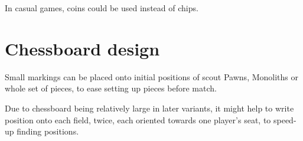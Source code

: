 In casual games, coins could be used instead of chips.

\section*{Chessboard design}
\label{sec:Remarks/Chessboard design}

Small markings can be placed onto initial positions of scout Pawns, Monoliths
or whole set of pieces, to ease setting up pieces before match.

Due to chessboard being relatively large in later variants, it might help to
write  position onto each field, twice, each oriented towards one
player's seat, to speed-up finding positions.

\clearpage %
